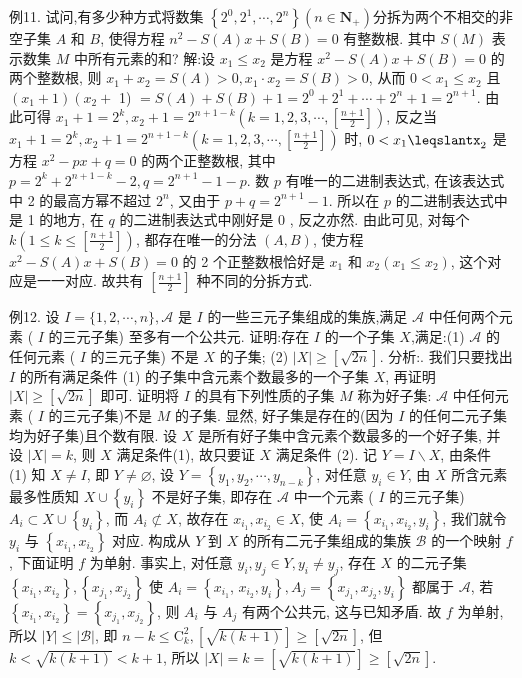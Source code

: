 例11. 试问,有多少种方式将数集 $\left\{2^0, 2^1, \cdots, 2^n\right\}\left(n \in \mathbf{N}_{+}\right)$分拆为两个不相交的非空子集 $A$ 和 $B$, 使得方程 $n^2-S(A) x+S(B)=0$ 有整数根.
其中 $S(M)$ 表示数集 $M$ 中所有元素的和?
解:设 $x_1 \leqslant x_2$ 是方程 $x^2-S(A) x+S(B)=0$ 的两个整数根, 则 $x_1+ x_2=S(A)>0, x_1 \cdot x_2=S(B)>0$, 从而 $0<x_1 \leqslant x_2$ 且 $\left(x_1+1\right)\left(x_2+\right.$ 1) $=S(A)+S(B)+1=2^0+2^1+\cdots+2^n+1=2^{n+1}$.
由此可得 $x_1+1=2^k, x_2+1=2^{n+1-k}\left(k=1,2,3, \cdots,\left[\frac{n+1}{2}\right]\right)$, 反之当 $x_1+1=2^k, x_2+1=2^{n+1-k}\left(k=1,2,3, \cdots,\left[\frac{n+1}{2}\right]\right)$ 时, $0<x_1 \leqslantx_2$ 是方程 $x^2-p x+q=0$ 的两个正整数根, 其中 $p=2^k+2^{n+1-k}-2, q=2^{n+1} -1-p$. 数 $p$ 有唯一的二进制表达式, 在该表达式中 2 的最高方幂不超过 $2^n$, 又由于 $p+q=2^{n+1}-1$. 所以在 $p$ 的二进制表达式中是 1 的地方, 在 $q$ 的二进制表达式中刚好是 0 , 反之亦然.
由此可见, 对每个 $k\left(1 \leqslant k \leqslant\left[\frac{n+1}{2}\right]\right)$, 都存在唯一的分法 $(A, B)$, 使方程 $x^2-S(A) x+S(B)=0$ 的 2 个正整数根恰好是 $x_1$ 和 $x_2\left(x_1 \leqslant x_2\right)$, 这个对应是一一对应.
故共有 $\left[\frac{n+1}{2}\right]$ 种不同的分拆方式.



例12. 设 $I=\{1,2, \cdots, n\}, \mathscr{A}$ 是 $I$ 的一些三元子集组成的集族,满足 $\mathscr{A}$ 中任何两个元素 ( $I$ 的三元子集) 至多有一个公共元.
证明:存在 $I$ 的一个子集 $X$,满足:(1) $\mathscr{A}$ 的任何元素 ( $I$ 的三元子集) 不是 $X$ 的子集; (2) $|X| \geqslant[\sqrt{2 n}]$.
分析:.
我们只要找出 $I$ 的所有满足条件 (1) 的子集中含元素个数最多的一个子集 $X$, 再证明 $|X| \geqslant[\sqrt{2 n}]$ 即可.
证明将 $I$ 的具有下列性质的子集 $M$ 称为好子集: $\mathscr{A}$ 中任何元素 ( $I$ 的三元子集)不是 $M$ 的子集.
显然, 好子集是存在的(因为 $I$ 的任何二元子集均为好子集)且个数有限.
设 $X$ 是所有好子集中含元素个数最多的一个好子集, 并设 $|X|=k$, 则 $X$ 满足条件(1), 故只要证 $X$ 满足条件 (2).
记 $Y=I \backslash X$, 由条件 (1) 知 $X \neq I$, 即 $Y \neq \varnothing$, 设 $Y=\left\{y_1, y_2, \cdots, y_{n-k}\right\}$, 对任意 $y_i \in Y$, 由 $X$ 所含元素最多性质知 $X \cup\left\{y_i\right\}$ 不是好子集, 即存在 $\mathscr{A}$ 中一个元素 ( $I$ 的三元子集) $A_i \subset X \cup\left\{y_i\right\}$, 而 $A_i \not \subset X$, 故存在 $x_{i_1}, x_{i_2} \in X$, 使 $A_i=\left\{x_{i_1}, x_{i_2}, y_i\right\}$, 我们就令 $y_i$ 与 $\left\{x_{i_1}, x_{i_2}\right\}$ 对应.
构成从 $Y$ 到 $X$ 的所有二元子集组成的集族 $\mathscr{B}$ 的一个映射 $f$, 下面证明 $f$ 为单射.
事实上, 对任意 $y_i, y_j \in Y, y_i \neq y_j$, 存在 $X$ 的二元子集 $\left\{x_{i_1}, x_{i_2}\right\},\left\{x_{j_1}, x_{j_2}\right\}$ 使 $A_i=\left\{x_{i_1}\right.$, $\left.x_{i_2}, y_i\right\}, A_j=\left\{x_{j_1}, x_{j_2}, y_i\right\}$ 都属于 $\mathscr{A}$, 若 $\left\{x_{i_1}, x_{i_2}\right\}=\left\{x_{j_1}, x_{j_2}\right\}$, 则 $A_i$ 与 $A_j$ 有两个公共元, 这与已知矛盾.
故 $f$ 为单射, 所以 $|Y| \leqslant|\mathscr{B}|$, 即 $n-k \leqslant \mathrm{C}_k^2,[\sqrt{k(k+1)}] \geqslant[\sqrt{2 n}]$, 但 $k<\sqrt{k(k+1)}<k+1$, 所以 $|X|=k= [\sqrt{k(k+1)}] \geqslant[\sqrt{2 n}]$.



